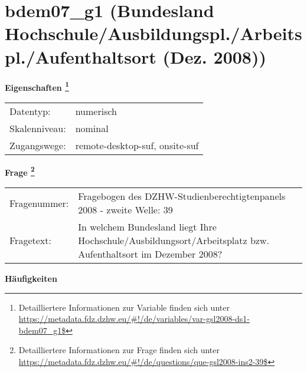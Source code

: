 
    \setcounter{footnote}{0}

    \vspace*{-1.8cm}
	\section{bdem07\_g1 (Bundesland Hochschule/Ausbildungspl./Arbeitspl./Aufenthaltsort (Dez. 2008))}
	\label{section:bdem07_g1}



    \vspace*{0.5cm}
    \noindent\textbf{Eigenschaften
	\footnote{Detailliertere Informationen zur Variable finden sich unter
		\url{https://metadata.fdz.dzhw.eu/\#!/de/variables/var-gsl2008-ds1-bdem07_g1$}}}\\
	\begin{tabularx}{\hsize}{@{}lX}
	Datentyp: & numerisch \\
	Skalenniveau: & nominal \\
	Zugangswege: &
	  remote-desktop-suf, 
	  onsite-suf
 \\
    \end{tabularx}



				\vspace*{0.5cm}
                \noindent\textbf{Frage
	                \footnote{Detailliertere Informationen zur Frage finden sich unter
		              \url{https://metadata.fdz.dzhw.eu/\#!/de/questions/que-gsl2008-ins2-39$}}}\\
				\begin{tabularx}{\hsize}{@{}lX}
					Fragenummer: &
					  Fragebogen des DZHW-Studienberechtigtenpanels 2008 - zweite Welle:
					  39
 \\
					Fragetext: & In welchem Bundesland liegt Ihre Hochschule/Ausbildungsort/Arbeitsplatz bzw. Aufenthaltsort im Dezember 2008? \\
				\end{tabularx}





        		\vspace*{0.5cm}
                \noindent\textbf{Häufigkeiten}

